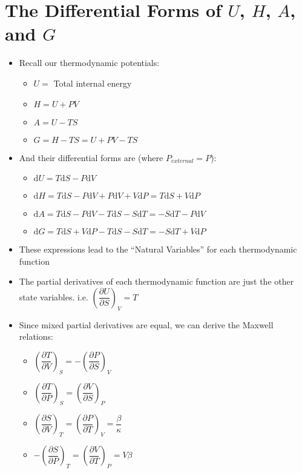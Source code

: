 \documentclass[12pt, openany, letterpaper]{memoir}
\begin{document}
\section*{The Differential Forms of $U$, $H$, $A$, and $G$}
\begin{itemize}
	\item Recall our thermodynamic potentials:
	\begin{itemize}
		\item $U = $ Total internal energy
		\item $H = U + PV$
		\item $A = U-TS$
		\item $G=H-TS=U+PV-TS$
	\end{itemize}
	\item And their differential forms are (where $P_{external}=P$):
	\begin{itemize}
		\item $\mathrm{d}U=T\mathrm{d}S-P\mathrm{d}V$
		\item $\mathrm{d}H=T\mathrm{d}S-P\mathrm{d}V + P\mathrm{d}V + V\mathrm{d}P = T\mathrm{d}S+V\mathrm{d}P$
		\item $\mathrm{d}A=T\mathrm{d}S-P\mathrm{d}V - T\mathrm{d}S - S\mathrm{d}T = -S\mathrm{d}T-P\mathrm{d}V$
		\item $\mathrm{d}G= T\mathrm{d}S+V\mathrm{d}P - T\mathrm{d}S - S\mathrm{d}T = -S\mathrm{d}T+V\mathrm{d}P$
	\end{itemize}
	\item These expressions lead to the ``Natural Variables'' for each thermodynamic function
	\item The partial derivatives of each thermodynamic function are just the other state variables. i.e. $\left(\dfrac{\partial U}{\partial S}\right)_V = T$
	\item Since mixed partial derivatives are equal, we can derive the Maxwell relations:
	\begin{itemize}
		\item $\left(\dfrac{\partial T}{\partial V}\right)_S = -\left(\dfrac{\partial P}{\partial S}\right)_V$
		\item $\left(\dfrac{\partial T}{\partial P}\right)_S = \left(\dfrac{\partial V}{\partial S}\right)_P$
		\item $\left(\dfrac{\partial S}{\partial V}\right)_T = \left(\dfrac{\partial P}{\partial T}\right)_V = \dfrac{\beta}{\kappa}$
		\item $-\left(\dfrac{\partial S}{\partial P}\right)_T = \left(\dfrac{\partial V}{\partial T}\right)_P = V\beta$
	\end{itemize}
\end{itemize}
\end{document}
